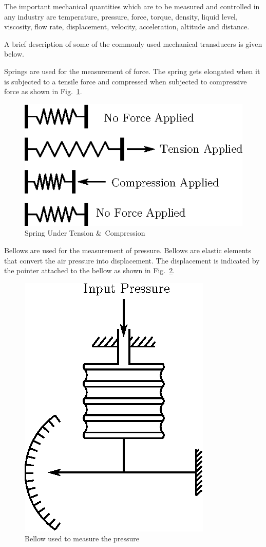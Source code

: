 The important mechanical quantities which are to be measured and controlled in any industry are temperature, pressure, force, torque, density, liquid level, viscosity, flow rate, displacement, velocity, acceleration, altitude and distance.

A brief description of some of the commonly used mechanical transducers is given below.

\smallskip

 Springs are used for the measurement of force. The spring gets elongated when it is subjected to a tensile force and compressed when subjected to compressive force as shown in Fig.~\ref{fig8.2}.
\begin{figure}[H]
\centering
\includegraphics[scale=.86]{chap8/fig8.2.eps}
\caption{Spring Under Tension \&\ Compression}\label{fig8.2}
\end{figure}

 Bellows are used for the measurement of pressure. Bellows are elastic elements that convert the air pressure into displacement. The displacement is indicated by the pointer attached to the bellow as shown in Fig.~\ref{fig8.3}.
\begin{figure}[H]
\centering
\includegraphics[scale=.86]{chap8/fig8.3.eps}
\caption{Bellow used to measure the pressure}\label{fig8.3}
\end{figure}

